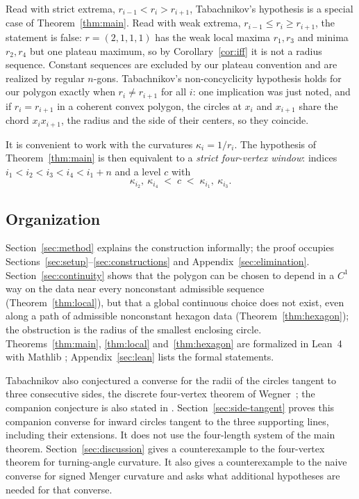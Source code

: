 \begin{remark}\label{rem:wording}
Read with strict extrema, $r_{i-1}<r_i>r_{i+1}$, Tabachnikov's hypothesis
is a special case of Theorem~\ref{thm:main}. Read with weak extrema,
$r_{i-1}\le r_i\ge r_{i+1}$, the statement is false: $r=(2,1,1,1)$ has the
weak local maxima $r_1,r_3$ and minima $r_2,r_4$ but one plateau maximum, so
by Corollary~\ref{cor:iff} it is not a radius sequence. Constant
sequences are excluded by our plateau convention and are realized by regular
$n$-gons.
Tabachnikov's non-concyclicity hypothesis holds for our polygon exactly when
$r_i\ne r_{i+1}$ for all $i$: one implication was just noted, and if
$r_i=r_{i+1}$ in a coherent convex polygon, the circles at $x_i$ and $x_{i+1}$ share the chord
$x_ix_{i+1}$, the radius and the side of their centers, so they coincide.
\end{remark}

It is convenient to work with the curvatures $\kappa_i=1/r_i$. The hypothesis
of Theorem~\ref{thm:main} is then equivalent to a \emph{strict four-vertex
window}: indices $i_1<i_2<i_3<i_4<i_1+n$ and a level $c$ with
\begin{equation}\label{eq:dfv}
  \kappa_{i_2},\ \kappa_{i_4} \;<\; c \;<\; \kappa_{i_1},\ \kappa_{i_3}.
\end{equation}

\subsection*{Organization}
Section~\ref{sec:method} explains the construction informally; the proof
occupies Sections~\ref{sec:setup}--\ref{sec:constructions} and
Appendix~\ref{sec:elimination}. Section~\ref{sec:continuity} shows that the
polygon can be chosen to depend in a $C^1$ way on the data near every
nonconstant admissible sequence (Theorem~\ref{thm:local}), but that a global
continuous choice does not exist, even along a path of admissible
nonconstant hexagon data (Theorem~\ref{thm:hexagon}); the obstruction is the
radius of the smallest enclosing circle. Theorems~\ref{thm:main},
\ref{thm:local} and~\ref{thm:hexagon} are formalized in Lean~4 with Mathlib
\cite{GluckLean}; Appendix~\ref{sec:lean} lists the formal statements.

Tabachnikov also conjectured a converse for the radii of the circles tangent
to three consecutive sides, the discrete four-vertex theorem of
Wegner~\cite{Wegner1994,Tabachnikov2000}; the companion conjecture is also
stated in \cite[Problem~2]{Tabachnikov2008}. Section~\ref{sec:side-tangent} proves this companion converse for inward
circles tangent to the three supporting lines, including their extensions.
It does not use the four-length system of the main theorem.
Section~\ref{sec:discussion} gives a counterexample to the four-vertex theorem
for turning-angle curvature. It also gives a counterexample to the naive
converse for signed Menger curvature and asks what additional hypotheses
are needed for that converse.
